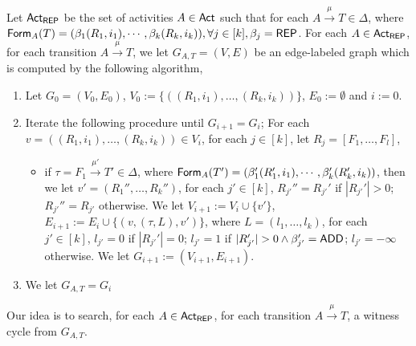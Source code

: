 {Let ${\sf Act}_{\mathsf{REP}}$ be the set of activities $A\in{\sf Act}$ such that for each $A\xrightarrow{\mu} T\in\Delta$, where $\mathsf{Form}_A(T) = (\beta_1(R_1, i_1), \cdots, \beta_k(R_k, i_k)),\forall j\in[k], \beta_j=\mathsf{REP}$.
For each $A\in{\sf Act}_{\mathsf{REP}}$, for each transition $A\xrightarrow{\mu} T$, we let $G_{A,T}=(V,E)$ be an edge-labeled graph which is computed by the following algorithm,
\begin{enumerate}
    \item Let $G_0 = (V_0,E_0)$, $V_0 := \{( (R_1,i_1),\dots,(R_k,i_k) )\}$, $E_0 := \emptyset$ and $i:=0$.
    \item Iterate the following procedure until $G_{i+1} = G_{i}$;
        For each $v = ( (R_1,i_1),\dots,(R_{k},i_{k}) ) \in V_{i}$, for each $j\in[k]$, let $R_j = [F_1,\dots,F_l]$, 
        \begin{itemize}
            \item if $\tau = F_1\xrightarrow{\mu'}T'\in\Delta$, where $\mathsf{Form}_A(T') = (\beta_1'(R_1', i_1), \cdots, \beta_k'(R_k', i_k))$, then we let $v' = (R_1'',\dots,R_k'')$, for each $j'\in[k]$, $R_{j'}''=R_{j'}'$ if $|R_{j'}'|>0$; $R_{j'}''=R_{j'}$ otherwise.  
                We let $V_{i+1}:= V_{i}\cup\{v'\}$, $E_{i+1} := E_{i}\cup\{(v,(\tau,L),v')\}$, where $L = (l_1,\dots,l_k)$, for each $j'\in[k]$, $l_{j'} = 0$ if $|R_{j'}'| = 0$; $l_{j'} = 1$ if $|R_{j'}'| > 0\wedge\beta_{j'}' = \mathsf{ADD}$; $l_{j'} = -\infty$ otherwise.
                We let $G_{i+1}:=(V_{i+1}, E_{i+1})$.
        \end{itemize}
    \item We let $G_{A,T}=G_{i}$
\end{enumerate}
Our idea is to search, for each $A\in{\sf Act}_{\mathsf{REP}}$, for each transition $A\xrightarrow{\mu} T$, a witness cycle from $G_{A,T}$.

}
